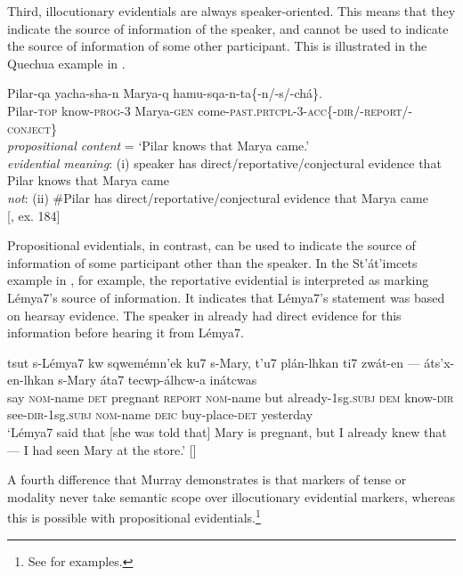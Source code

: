 Third, illocutionary evidentials are always speaker-oriented. This means that they indicate the source of information of the speaker, and cannot be used to indicate the source of information of some other participant. This is illustrated in the Quechua example in .


\ea \label{ex:17.13}
\gll Pilar-qa  yacha-sha-n  Marya-q  hamu-sqa-n-ta\{-n/-s/-chá\}.\\
Pilar-\textsc{top}  know-\textsc{prog}-3  Marya-\textsc{gen}  come-\textsc{past.prtcpl}-3-\textsc{acc\{-dir}/-\textsc{report}/-\textsc{conject\}}\\
\glt \textit{propositional content} = ‘Pilar knows that Marya came.’\\
\textit{evidential meaning}: (i) speaker has direct/reportative/conjectural evidence that\\
    Pilar knows that Marya came\\
\textit{not}: (ii) \#Pilar has direct/reportative/conjectural evidence that Marya came\\
     {}[\citealt{Faller2002}, ex. 184]
\z


Propositional evidentials, in contrast, can be used to indicate the source of information of some participant other than the speaker. In the St’át’imcets example in , for example, the reportative evidential is interpreted as marking Lémya7’s source of information. It indicates that Lémya7’s statement was based on hearsay evidence. The speaker in  already had direct evidence for this information before hearing it from Lémya7.


\ea  \label{ex:17.14}
\gll tsut  s-Lémya7  kw  sqwemémn’ek  ku7  s-Mary,  t’u7  plán-lhkan ti7  zwát-en  —  áts’x-en-lhkan  s-Mary  áta7  tecwp-álhcw-a  inátcwas\\
say  \textsc{nom}-name  \textsc{det}  pregnant  \textsc{report  nom}-name  but  already-1sg.\textsc{subj} \textsc{dem}  know-\textsc{dir}    see-\textsc{dir}-1sg.\textsc{subj}  \textsc{nom}-name  \textsc{deic}  buy-place-\textsc{det}  yesterday\\
\glt ‘Lémya7 said that [she was told that] Mary is pregnant, but I already knew that — I had seen Mary at the store.’   [\citealt{MatthewsonEtAl2007}]
\z

A fourth difference that Murray demonstrates is that markers of tense or modality never take semantic scope over illocutionary evidential markers, whereas this is possible with propositional evidentials.\footnote{See \citet[sec. 3.4.2]{Murray2010} for examples.}



